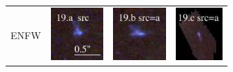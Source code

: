 \documentclass[useAMS,usenatbib]{mn2e}
\begin{document}
\begin{table}
\begin{tabular}{cccc}
    \multicolumn{1}{m{1cm}}{{\Large ENFW}}
    & \multicolumn{1}{m{1.7cm}}{\includegraphics[height=2.00cm,clip]{figs/enfw_img/rgb.src_19_a.ps}}
    & \multicolumn{1}{m{1.7cm}}{\includegraphics[height=2.00cm,clip]{figs/enfw_img/rgb.pre_19_b_a_tri.ps}}
    & \multicolumn{1}{m{1.7cm}}{\includegraphics[height=2.00cm,clip]{figs/enfw_img/rgb.pre_19_c_a_tri.ps}} \\
  \end{tabular}

\end{table}
\end{document}
